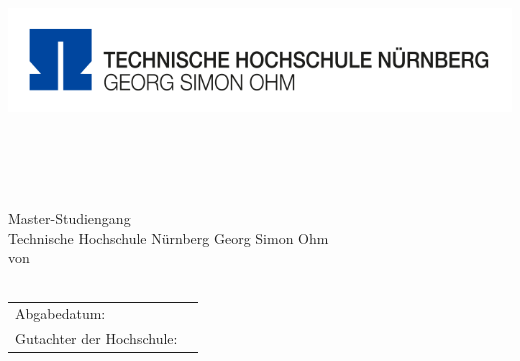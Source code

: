 \thispagestyle{plain}
\begin{titlepage}
\enlargethispage{3.5cm}
\sffamily 								%
\begin{minipage}{\textwidth}
	\vspace{-2cm}
	\noindent \includegraphics[scale=0.2]{Images/Logo_TH.png} \hfill
\end{minipage} 
\begin{center}

\huge{\textsc{\textbf{\titel}}}\\[1.5ex]
\Large{\textbf{\untertitel}}\\[5ex]
\LARGE{\textbf{\arbeit}}\\[2ex]
\normalsize{~}\\[3ex]
\Large{Master-Studiengang \textit{\studiengang}}\\[1ex]
\normalsize{Technische Hochschule Nürnberg Georg Simon Ohm}\\[5ex]
von\\[1ex] \autor \\[12ex]

\begin{tabular}{ll}
	Abgabedatum:					& \quad \abgabeTH \\ 
	
	Gutachter der Hochschule: & \quad \betreuerth \\ 
	
\end{tabular} 

\end{center}

\end{titlepage}
\onehalfspacing